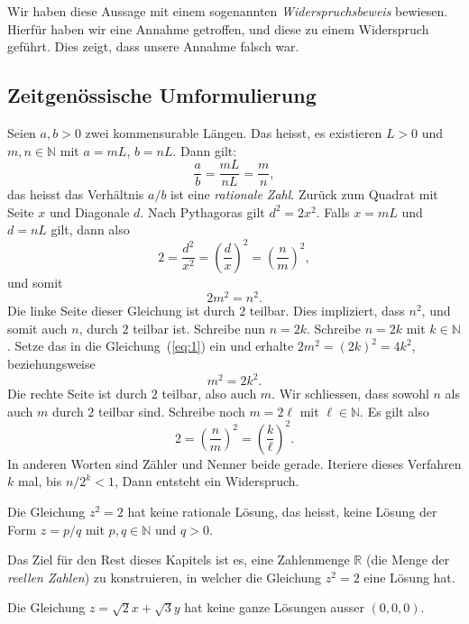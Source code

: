 \documentclass[../main.tex]{subfiles}
\begin{document}
Wir haben diese Aussage mit einem sogenannten \textit{Widerspruchsbeweis} bewiesen.
Hierfür haben wir eine Annahme getroffen, und diese zu einem Widerspruch geführt.
Dies zeigt, dass unsere Annahme falsch war.

\subsection*{Zeitgenössische Umformulierung}
Seien $a,b > 0$ zwei kommensurable Längen. Das heisst, es existieren $L > 0$
und $m,n \in \mathbb N$ mit $a = mL$, $b= nL$. Dann gilt:
\[\frac{a}{b} = \frac{mL}{nL} = \frac{m}{n},\]
das heisst das Verhältnis $a/b$ ist eine \textit{rationale Zahl}.
Zurück zum Quadrat mit Seite $x$ und Diagonale $d$. Nach Pythagoras
gilt $d^{2} = 2x^{2}$. Falls $x=mL$ und $d=nL$ gilt,
dann also
\[2 = \frac{d^{2}}{x^{2}} = {\left( \frac{d}{x}\right)}^{2} = {\left(\frac{n}{m}\right)}^{2},\]
und somit
\begin{equation}
  \label{eq:1}
2m^{2} = n^{2}.
\end{equation}
Die linke Seite dieser Gleichung ist durch $2$ teilbar. Dies impliziert, dass $n^{2}$, und
somit auch $n$, durch $2$ teilbar ist. Schreibe nun $n = 2k$. Schreibe $n = 2k$ mit
$k \in \mathbb N$. Setze das in die Gleichung~(\ref{eq:1}) ein und erhalte
$2m^{2} = {(2k)}^{2} = 4k^{2}$,
beziehungsweise
\[m^{2} = 2k^{2}.\]
Die rechte Seite ist durch $2$ teilbar, also auch $m$.
Wir schliessen, dass sowohl $n$ als auch $m$ durch $2$ teilbar sind.
Schreibe noch $m = 2\ell$ mit $\ell \in \mathbb N$. Es gilt also
\[ 2 = {\left(\frac{n}{m}\right)}^{2}
  = {\left(\frac{k}{\ell}\right)}^{2}.\]
In anderen Worten sind Zähler und Nenner beide gerade.
Iteriere dieses Verfahren $k$ mal, bis $n/2^{k} < 1$, Dann entsteht ein Widerspruch.

\begin{corollary}
  Die Gleichung $z^{2} = 2$ hat keine rationale Lösung, das heisst,
  keine Lösung der Form $z = p/q$ mit $p, q \in \mathbb N$ und $q > 0$.
\end{corollary}

Das Ziel für den Rest dieses Kapitels ist es, eine Zahlenmenge $\mathbb R$ (die Menge
der \textit{reellen Zahlen}) zu konstruieren, in welcher die Gleichung
$z^{2} = 2$ eine Lösung hat.

\begin{exercise}
  Die Gleichung $z = \sqrt 2 x + \sqrt 3 y$ hat keine ganze Lösungen ausser $(0,0,0)$.
\end{exercise}
\end{document}
